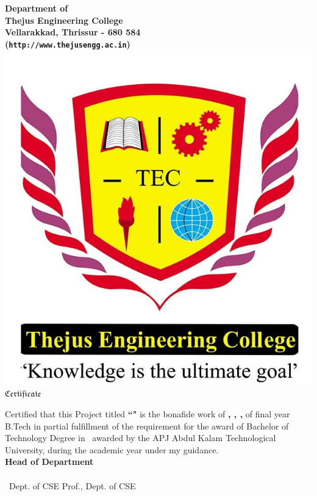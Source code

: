\begin{titlepage}


\begin{center}


{\Large \bf Department of \vdept  }\\
{\Large \bf Thejus Engineering College}\\
{\normalsize \bf Vellarakkad, Thrissur - 680 584\\
({\tt http://www.thejusengg.ac.in})}\\[1.5 cm]
%
%
\includegraphics[width=3.5 cm]{thejus.png}\\
 [1 cm]
%
 \Huge  $ \mathfrak{Certificate}$\\[0.5cm]
%
\end{center}

\quad Certified that this Project titled {\bf ``\vtitle"} is the bonafide work of {\bf \vauthora, \vauthorb, \vauthorc, \vauthord }  of final year B.Tech in partial fulfillment of the requirement for the award of Bachelor of Technology Degree in \vdept\ awarded by the APJ Abdul Kalam Technological University, during the academic year \vacademicyear under my guidance.\\[2 cm]
 
 \hfill  {\bf Head of Department} \\[.3cm]
\noindent \vguide \hfill \vhod \\ \vguidedg\ Dept. of CSE \hfill Prof., Dept. of CSE  



%
\end{titlepage}

%  